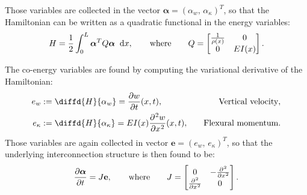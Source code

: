 \documentclass[11pt]{article}
\begin{document}
	Those variables are collected in the vector $\bm{\alpha} = (\alpha_{w}, \, \alpha_{\kappa})^T $, so that the Hamiltonian can be written as a quadratic functional in the energy variables: 
	\begin{equation}
	H = \frac{1}{2} \int_{0}^{L} \bm{\alpha}^T Q \bm{\alpha} \; \d{x},
	\qquad \text{where} \qquad
	Q = 
	\begin{bmatrix}
	\frac{1}{\rho(x)} & 0 \\
	0 & EI(x) \\
	\end{bmatrix}.
	\end{equation}
	
	The co-energy variables are found by computing the variational derivative of the Hamiltonian:
	\begin{equation}
	\begin{aligned}
	e_{w} &:= \diffd{H}{\alpha_w} = \diffp{w}{t}(x,t) ,  &\quad \text{Vertical velocity}, \\
	e_{\kappa} &:= \diffd{H}{\alpha_{\kappa}} =EI(x) \diffp[2]{w}{x}(x,t),  &\quad \text{Flexural momentum}. \\
	\end{aligned}
	\end{equation}
	Those variables are again collected in vector $\bm{e} = (e_{w}, \, e_{\kappa})^T $, so that the underlying interconnection structure is then found to be:
	\begin{equation}
	\label{eq:PH_Timo}
	\diffp{\bm{\alpha}}{t} = J \mathbf{e},  	\qquad \text{where} \qquad
	J = 
	\begin{bmatrix}
	0 & -\diffp[2]{}{x} \\
	\diffp[2]{}{x} & 0 \\
	\end{bmatrix}.
	\end{equation}
	
\end{document}
